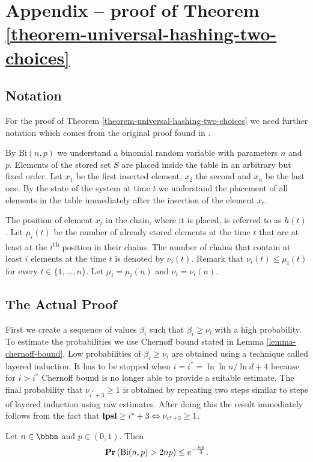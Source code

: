 \section*{Appendix -- proof of Theorem \ref{theorem-universal-hashing-two-choices}}
\subsection{Notation}
For the proof of Theorem \ref{theorem-universal-hashing-two-choices} we need further notation which comes from the original proof found in \cite{Mitzenmacher:2005:PCR:1076315}. 

By $\mathrm{Bi}(n, p)$ we understand a binomial random variable with parameters $n$ and $p$.
Elements of the stored set $S$ are placed inside the table in an arbitrary but fixed order. Let $x_1$ be the first inserted element, $x_2$ the second and $x_n$ be the last one.
By the state of the system at time $t$ we understand the placement of all elements in the table immediately after the insertion of the element $x_t$. 

The position of element $x_t$ in the chain, where it is placed, is referred to as $h(t)$. Let $\mu_i(t)$ be the number of already stored elements at the time $t$ that are at least at the $i$\textsuperscript{th} position in their chains. The number of chains that contain at least $i$ elements at the time $t$ is denoted by $\nu_i(t)$. Remark that $\nu_i(t) \leq \mu_i(t)$ for every $t \in \{1, \dots, n \}$. Let $\mu_i = \mu_i(n)$ and $\nu_i = \nu_i(n)$.

\subsection{The Actual Proof}
First we create a sequence of values $\beta_i$ such that $\beta_i \geq \nu_i$ with a high probability. To estimate the probabilities we use Chernoff bound stated in Lemma \ref{lemma-chernoff-bound}. Low probabilities of $\beta_i \geq \nu_i$ are obtained using a technique called layered induction. It has to be stopped when $i = i^* = \ln \ln n/\ln d + 4$ because for $i > i^*$ Chernoff bound is no longer able to provide a suitable estimate. The final probability that $\nu_{i^*+3} \geq 1$ is obtained by repeating two steps similar to steps of layered induction using raw estimates. After doing this the result immediately follows from the fact that $\mathbf{lpsl} \geq i^*+3 \Leftrightarrow \nu_{i^* + 3} \geq 1$.

\begin{lemma}
\label{lemma-chernoff-bound}
Let $n \in \bbbn$ and $p \in (0, 1)$. Then $$\mathbf{Pr}\left(\mathrm{Bi}(n, p) > 2np\right) \leq e ^ {- \frac{np}{3}} \textit{.}$$
\end{lemma}

